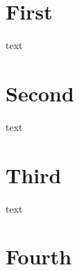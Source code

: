 \documentclass{book}
\begin{document}
\simplechapter
\chapter{First}
text
\renewcommand{\simplechapterdelim}{:}
\chapter{Second}
text
\restorechapter %
\simplechapter[Chap]
\chapter{Third}
text
\restorechapter
\chapter{Fourth}
\end{document}
